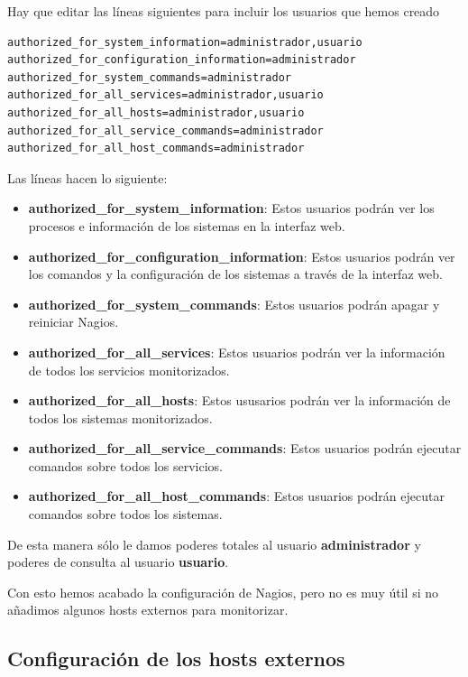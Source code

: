 \documentclass[11pt,a4paper]{article}
\begin{document}
Hay que editar las líneas siguientes para incluir los usuarios que hemos creado

\begin{verbatim}
authorized_for_system_information=administrador,usuario
authorized_for_configuration_information=administrador
authorized_for_system_commands=administrador
authorized_for_all_services=administrador,usuario
authorized_for_all_hosts=administrador,usuario
authorized_for_all_service_commands=administrador
authorized_for_all_host_commands=administrador
\end{verbatim}

Las líneas hacen lo siguiente:

\begin{itemize}
\item \textbf{authorized\_for\_system\_information}: Estos usuarios podrán ver los procesos e información de los sistemas en la interfaz web.
\item \textbf{authorized\_for\_configuration\_information}: Estos usuarios podrán ver los comandos y la configuración de los sistemas a través de la interfaz web.
\item \textbf{authorized\_for\_system\_commands}: Estos usuarios podrán apagar y reiniciar Nagios.
\item \textbf{authorized\_for\_all\_services}: Estos usuarios podrán ver la información de todos los servicios monitorizados.
\item \textbf{authorized\_for\_all\_hosts}: Estos ususarios podrán ver la información de todos los sistemas monitorizados.
\item \textbf{authorized\_for\_all\_service\_commands}: Estos usuarios podrán ejecutar comandos sobre todos los servicios.
\item \textbf{authorized\_for\_all\_host\_commands}: Estos usuarios podrán ejecutar comandos sobre todos los sistemas.
\end{itemize}

De esta manera sólo le damos poderes totales al usuario \textbf{administrador} y poderes de consulta al usuario \textbf{usuario}.

Con esto hemos acabado la configuración de Nagios, pero no es muy útil si no añadimos algunos hosts externos para monitorizar.

\subsection{Configuración de los hosts externos}
\end{document}
